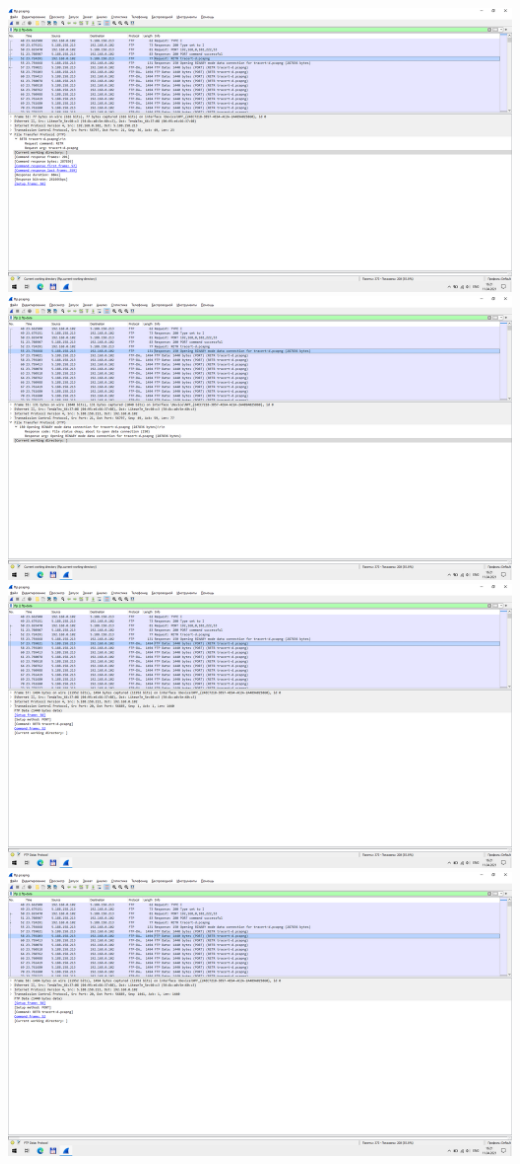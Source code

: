 \includegraphics{screenshots/ftp_retr_request_1}
\includegraphics{screenshots/ftp_retr_response_1}
\includegraphics{screenshots/ftp_transfer_1}
\includegraphics{screenshots/ftp_transfer_2}
